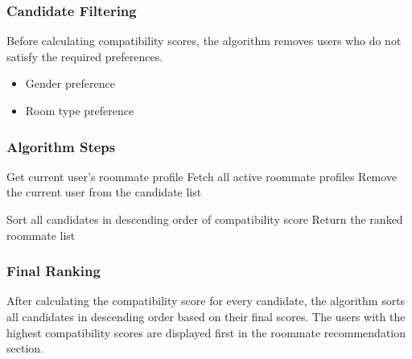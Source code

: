 \subsubsection{Candidate Filtering}
Before calculating compatibility scores, the algorithm removes users who do not satisfy the required preferences.
\begin{itemize}
    \item Gender preference
    \item Room type preference
\end{itemize}

\subsubsection{Algorithm Steps}
\begin{algorithm}[!htb]
\caption{Roommate Compatibility Scoring Algorithm}
\label{alg:roommate-matching}

Get current user's roommate profile\;
Fetch all active roommate profiles\;
Remove the current user from the candidate list\;


Sort all candidates in descending order of compatibility score\;
Return the ranked roommate list\;
\end{algorithm}

\subsubsection{Final Ranking}
After calculating the compatibility score for every candidate, the algorithm sorts all candidates in descending order based on their final scores. The users with the highest compatibility scores are displayed first in the roommate recommendation section.

